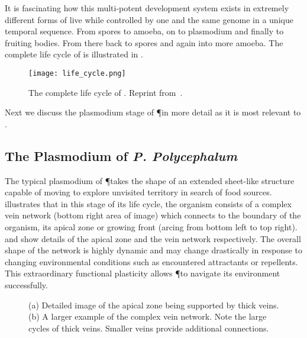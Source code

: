 		It is fascinating how this multi-potent development system exists in extremely different forms of live while controlled by one and the same genome in a unique temporal sequence. From spores to amoeba, on to plasmodium and finally to fruiting bodies. From there back to spores and again into more amoeba. The complete life cycle of \Pp is illustrated in .

		\begin{figure}[htb]
			\centering
			\texttt{[image: life\_cycle.png]}
			\caption[Life cycle of \P]{The complete life cycle of \Pp. Reprint from~\cite{Sauer1986}.}
			\label{fig:life_cycle}
		\end{figure}

		Next we discuss the plasmodium stage of \P in more detail as it is most relevant to .

		\FloatBarrier

	\subsection{The Plasmodium of \textit{P. Polycephalum}}

		The typical plasmodium of \P takes the shape of an extended sheet-like structure capable of moving to explore unvisited territory in search of food sources.  illustrates that in this stage of its life cycle, the organism consists of a complex vein network (bottom right area of image) which connects to the boundary of the organism, its apical zone or growing front (arcing from bottom left to top right).  and  show details of the apical zone and the vein network respectively. The overall shape of the network is highly dynamic and may change drastically in response to changing environmental conditions such as encountered attractants or repellents. This extraordinary functional plasticity allows \P to navigate its environment successfully.

		
		\begin{figure}[!htbp]
			\centering
			\qquad
			\caption[Details of apical zone and supporting network]{(a) Detailed image of the apical zone being supported by thick veins. (b) A larger example of the complex vein network. Note the large cycles of thick veins. Smaller veins provide additional connections.}
			\label{fig:plasmodium_details}
		\end{figure}

